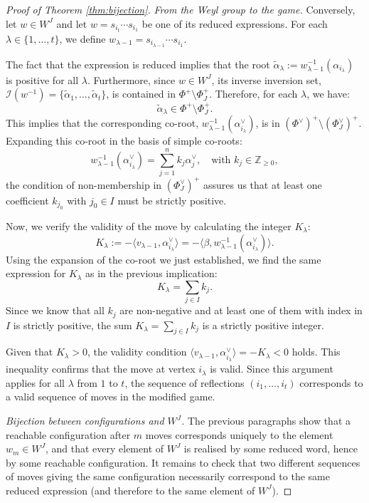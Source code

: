 \documentclass[11pt,a4paper]{amsart}
\theoremstyle{plain}
\theoremstyle{definition}
\theoremstyle{remark}
\begin{document}
\begin{proof}[Proof of Theorem \ref{thm:bijection}]
    \medskip
    \noindent\textit{From the Weyl group to the game.}
    Conversely, let $w \in W^J$ and let $w = s_{i_t}\cdots s_{i_1}$ be one of its reduced expressions. For each $\lambda \in \{1, \dots, t\}$, we define $w_{\lambda-1} = s_{i_{\lambda-1}}\cdots s_{i_1}$.

    The fact that the expression is reduced implies that the root $\tilde{\alpha}_\lambda := w_{\lambda-1}^{-1}(\alpha_{i_\lambda})$ is positive for all $\lambda$. Furthermore, since $w \in W^J$, its inverse inversion set, $\mathcal{I}(w^{-1}) = \{\tilde{\alpha}_1, \dots, \tilde{\alpha}_t\}$, is contained in $\Phi^+ \setminus \Phi_J^+$. Therefore, for each $\lambda$, we have:
    \[
    \tilde{\alpha}_\lambda \in \Phi^+ \setminus \Phi_J^+.
    \]
    This implies that the corresponding co-root, $w_{\lambda-1}^{-1}(\alpha_{i_\lambda}^\vee)$, is in $(\Phi^\vee)^+ \setminus (\Phi_J^\vee)^+$. Expanding this co-root in the basis of simple co-roots:
    \[
    w_{\lambda-1}^{-1}(\alpha_{i_\lambda}^\vee) = \sum_{j=1}^n k_j \alpha_j^\vee, \quad \text{with } k_j \in \mathbb{Z}_{\ge 0},
    \]
    the condition of non-membership in $(\Phi_J^\vee)^+$ assures us that at least one coefficient $k_{j_0}$ with $j_0 \in I$ must be strictly positive.

    Now, we verify the validity of the move by calculating the integer $K_\lambda$:
    \[
    K_\lambda := -\langle v_{\lambda-1}, \alpha_{i_\lambda}^\vee \rangle = -\langle \beta, w_{\lambda-1}^{-1}(\alpha_{i_\lambda}^\vee) \rangle.
    \]
    Using the expansion of the co-root we just established, we find the same expression for $K_\lambda$ as in the previous implication:
    \[
    K_\lambda = \sum_{j \in I} k_j.
    \]
    Since we know that all $k_j$ are non-negative and at least one of them with index in $I$ is strictly positive, the sum $K_\lambda = \sum_{j \in I} k_j$ is a strictly positive integer.

    Given that $K_\lambda > 0$, the validity condition $\langle v_{\lambda-1}, \alpha_{i_\lambda}^\vee \rangle = -K_\lambda < 0$ holds. This inequality confirms that the move at vertex $i_\lambda$ is valid. Since this argument applies for all $\lambda$ from $1$ to $t$, the sequence of reflections $(i_1, \dots, i_t)$ corresponds to a valid sequence of moves in the modified game.

    \medskip
    \noindent\textit{Bijection between configurations and $W^J$.}
    The previous paragraphs show that a reachable configuration after $m$ moves corresponds uniquely to the element $w_m \in W^J$, and that every element of $W^J$ is realised by some reduced word, hence by some reachable configuration. It remains to check that two different sequences of moves giving the same configuration necessarily correspond to the same reduced expression (and therefore to the same element of $W^J$). 


\end{proof}
\end{document}
